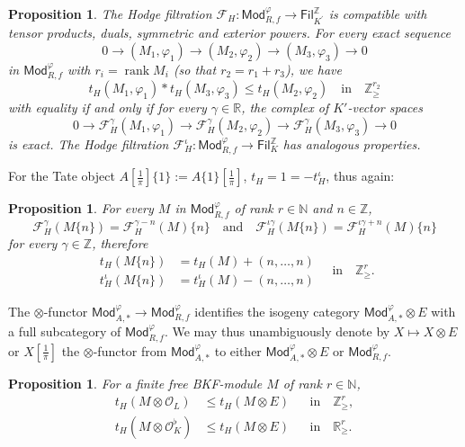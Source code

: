 \documentclass[11pt]{article}
\newtheorem{prop}[theo]{Proposition}
\theoremstyle{definition}
\numberwithin{equation}{section}
\numberwithin{figure}{section}
\numberwithin{table}{section}
\newcommand{\Mod}{\mathsf{Mod}}
\newcommand{\Fil}{\mathsf{Fil}}
\DeclareMathOperator{\rank}{rank}
\begin{document}
\begin{prop}\label{prop:Hodge4A=00005B1/pi=00005D_tensorexact}
The Hodge filtration $\mathcal{F}_{H}:\Mod_{R,f}^{\varphi}\rightarrow\Fil_{K^{\prime}}^{\mathbb{Z}}$ is compatible with tensor products, duals, symmetric and exterior powers. For every exact sequence
\[
0\rightarrow(M_{1},\varphi_{1})\rightarrow(M_{2},\varphi_{2})\rightarrow(M_{3},\varphi_{3})\rightarrow0
\]
in $\Mod_{R,f}^{\varphi}$ with $r_{i}=\rank M_{i}$ (so that $r_{2}=r_{1}+r_{3}$), we have
\[
t_{H}(M_{1},\varphi_{1})\ast t_{H}(M_{3},\varphi_{3})\leq t_{H}(M_{2},\varphi_{2})\quad\text{in}\quad\mathbb{Z}_{\geq}^{r_{2}}
\]
with equality if and only if for every $\gamma\in\mathbb{R}$, the complex of $K'$-vector spaces
\[
0\rightarrow\mathcal{F}_{H}^{\gamma}(M_{1},\varphi_{1})\rightarrow\mathcal{F}_{H}^{\gamma}(M_{2},\varphi_{2})\rightarrow\mathcal{F}_{H}^{\gamma}(M_{3},\varphi_{3})\rightarrow0
\]
is exact. The Hodge filtration $\mathcal{F}_{H}^{\iota}:\Mod_{R,f}^{\varphi}\rightarrow\Fil_{K}^{\mathbb{Z}}$ has analogous properties.
\end{prop}

For the Tate object $A[\frac{1}{\pi}]\{1\}:=A\{1\}[\frac{1}{\pi}]$, $t_{H}=1=-t_{H}^{\iota}$, thus again:

\begin{prop}\label{prop:t_H(twist)4A=00005B1/pi=00005D}
For every $M$ in $\Mod_{R,f}^{\varphi}$ of rank $r\in\mathbb{N}$ and $n\in\mathbb{Z}$,
\[
\mathcal{F}_{H}^{\gamma}(M\{n\})=\mathcal{F}_{H}^{\gamma-n}(M)\{n\}\quad\text{and}\quad\mathcal{F}_{H}^{\iota\gamma}(M\{n\})=\mathcal{F}_{H}^{\iota\gamma+n}(M)\{n\}
\]
for every $\gamma\in\mathbb{Z}$, therefore
\[
\begin{aligned}
t_{H}(M\{n\}) & = t_{H}(M)+(n,\dots,n)\\
t_{H}^{\iota}(M\{n\}) & = t_{H}^{\iota}(M)-(n,\dots,n)
\end{aligned}\quad\text{in}\quad\mathbb{Z}_{\geq}^{r}.
\]
\end{prop}

The $\otimes$-functor $\Mod_{A,\ast}^{\varphi}\rightarrow\Mod_{R,f}^{\varphi}$ identifies the isogeny category $\Mod_{A,\ast}^{\varphi}\otimes E$ with a full subcategory of $\Mod_{R,f}^{\varphi}$. We may thus unambiguously denote by $X\mapsto X\otimes E$ or $X[\frac{1}{\pi}]$ the $\otimes$-functor from $\Mod_{A,\ast}^{\varphi}$ to either $\Mod_{A,\ast}^{\varphi}\otimes E$ or $\Mod_{R,f}^{\varphi}$.

\begin{prop}\label{prop:CompHodgeA=00005B1/pi=00005DOLA1}
For a finite free BKF-module $M$ of rank $r\in\mathbb{N}$,
\[
\begin{aligned}
t_{H}(M\otimes\mathcal{O}_{L}) & \leq t_{H}\left(M\otimes E\right) && \text{in}\quad\mathbb{Z}_{\geq}^{r},\\
t_{H}(M\otimes\mathcal{O}_{K}^{\flat}) & \leq t_{H}\left(M\otimes E\right) && \text{in}\quad\mathbb{R}_{\geq}^{r}.
\end{aligned}
\]
\end{prop}
\end{document}
